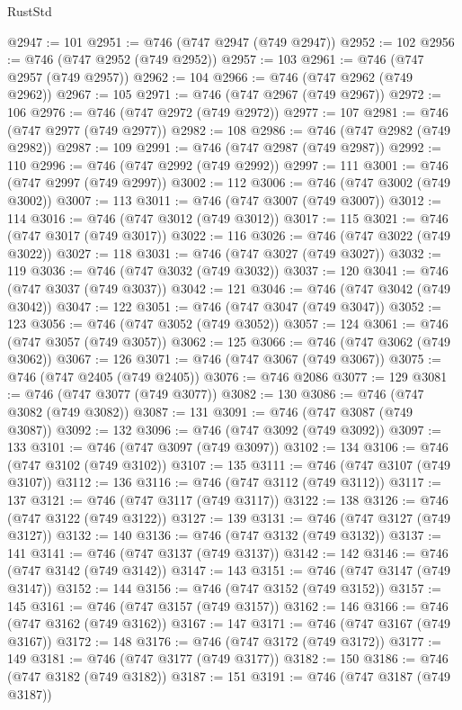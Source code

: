 \begin{lexlean}{RustStd}
\begin{coremodule}
@2947 := 101
@2951 := @746 (@747 @2947 (@749 @2947))
@2952 := 102
@2956 := @746 (@747 @2952 (@749 @2952))
@2957 := 103
@2961 := @746 (@747 @2957 (@749 @2957))
@2962 := 104
@2966 := @746 (@747 @2962 (@749 @2962))
@2967 := 105
@2971 := @746 (@747 @2967 (@749 @2967))
@2972 := 106
@2976 := @746 (@747 @2972 (@749 @2972))
@2977 := 107
@2981 := @746 (@747 @2977 (@749 @2977))
@2982 := 108
@2986 := @746 (@747 @2982 (@749 @2982))
@2987 := 109
@2991 := @746 (@747 @2987 (@749 @2987))
@2992 := 110
@2996 := @746 (@747 @2992 (@749 @2992))
@2997 := 111
@3001 := @746 (@747 @2997 (@749 @2997))
@3002 := 112
@3006 := @746 (@747 @3002 (@749 @3002))
@3007 := 113
@3011 := @746 (@747 @3007 (@749 @3007))
@3012 := 114
@3016 := @746 (@747 @3012 (@749 @3012))
@3017 := 115
@3021 := @746 (@747 @3017 (@749 @3017))
@3022 := 116
@3026 := @746 (@747 @3022 (@749 @3022))
@3027 := 118
@3031 := @746 (@747 @3027 (@749 @3027))
@3032 := 119
@3036 := @746 (@747 @3032 (@749 @3032))
@3037 := 120
@3041 := @746 (@747 @3037 (@749 @3037))
@3042 := 121
@3046 := @746 (@747 @3042 (@749 @3042))
@3047 := 122
@3051 := @746 (@747 @3047 (@749 @3047))
@3052 := 123
@3056 := @746 (@747 @3052 (@749 @3052))
@3057 := 124
@3061 := @746 (@747 @3057 (@749 @3057))
@3062 := 125
@3066 := @746 (@747 @3062 (@749 @3062))
@3067 := 126
@3071 := @746 (@747 @3067 (@749 @3067))
@3075 := @746 (@747 @2405 (@749 @2405))
@3076 := @746 @2086
@3077 := 129
@3081 := @746 (@747 @3077 (@749 @3077))
@3082 := 130
@3086 := @746 (@747 @3082 (@749 @3082))
@3087 := 131
@3091 := @746 (@747 @3087 (@749 @3087))
@3092 := 132
@3096 := @746 (@747 @3092 (@749 @3092))
@3097 := 133
@3101 := @746 (@747 @3097 (@749 @3097))
@3102 := 134
@3106 := @746 (@747 @3102 (@749 @3102))
@3107 := 135
@3111 := @746 (@747 @3107 (@749 @3107))
@3112 := 136
@3116 := @746 (@747 @3112 (@749 @3112))
@3117 := 137
@3121 := @746 (@747 @3117 (@749 @3117))
@3122 := 138
@3126 := @746 (@747 @3122 (@749 @3122))
@3127 := 139
@3131 := @746 (@747 @3127 (@749 @3127))
@3132 := 140
@3136 := @746 (@747 @3132 (@749 @3132))
@3137 := 141
@3141 := @746 (@747 @3137 (@749 @3137))
@3142 := 142
@3146 := @746 (@747 @3142 (@749 @3142))
@3147 := 143
@3151 := @746 (@747 @3147 (@749 @3147))
@3152 := 144
@3156 := @746 (@747 @3152 (@749 @3152))
@3157 := 145
@3161 := @746 (@747 @3157 (@749 @3157))
@3162 := 146
@3166 := @746 (@747 @3162 (@749 @3162))
@3167 := 147
@3171 := @746 (@747 @3167 (@749 @3167))
@3172 := 148
@3176 := @746 (@747 @3172 (@749 @3172))
@3177 := 149
@3181 := @746 (@747 @3177 (@749 @3177))
@3182 := 150
@3186 := @746 (@747 @3182 (@749 @3182))
@3187 := 151
@3191 := @746 (@747 @3187 (@749 @3187))

\end{coremodule}
\end{lexlean}
